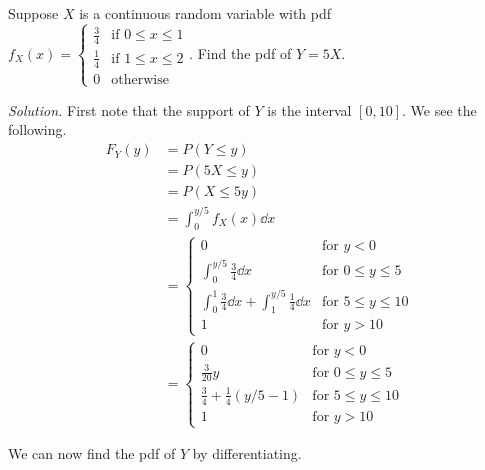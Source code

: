 \begin{example}
	Suppose $X$ is a continuous random variable with pdf $f_X(x)=\begin{cases}
		\frac 34 & \text{if $0\leq x\leq 1$}\\
		\frac 14 & \text{if $1\leq x\leq 2$}\\
		0 & \text{otherwise}
	\end{cases}$.
	Find the pdf of $Y=5X$.

	\textit{Solution.} First note that the support of $Y$ is the interval $[0,10]$. We see the following.
	\begin{align*}
		F_Y(y)&=P(Y\leq y)\\
		&=P(5X\leq y)\\
		&=P(X\leq 5y)\\
		&=\int_0^{y/5}f_X(x)\dd x\\
		&=\begin{cases}
			0 & \text{for $y<0$}\\
			\int_0^{y/5}\frac 34\dd x & \text{for $0\leq y \leq 5$}\\
			\int_0^{1}\frac 34\dd x+\int_1^{y/5}\frac 14\dd x & \text{for $5\leq y \leq 10$}\\
			1 & \text{for $y>10$}
		\end{cases}\\
		&=\begin{cases}
			0 & \text{for $y<0$}\\
			\frac 3{20}y & \text{for $0\leq y \leq 5$}\\
			\frac 34+\frac 14(y/5-1) & \text{for $5\leq y \leq 10$}\\
			1 & \text{for $y>10$}
		\end{cases}
	\end{align*}

	We can now find the pdf of $Y$ by differentiating.
\end{example}

